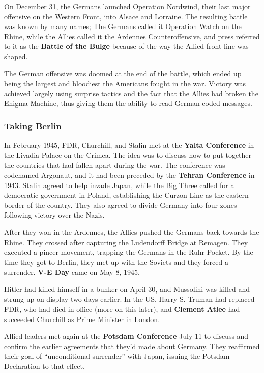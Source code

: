 On December 31, the Germans launched Operation Nordwind,
their last major offensive on the Western Front,
into Alsace and Lorraine.
The resulting battle was known by many names;
The Germans called it Operation Watch on the Rhine,
while the Allies called it the Ardennes Counteroffensive,
and press referred to it as the \textbf{Battle of the Bulge}
because of the way the Allied front line was shaped.

The German offensive was doomed at the end of the battle,
which ended up being the largest and bloodiest the Americans fought in the war.
Victory was achieved largely using surprise tactics
and the fact that the Allies had broken the Enigma Machine,
thus giving them the ability to read German coded messages.

\subsubsection*{Taking Berlin}

In February 1945, FDR, Churchill, and Stalin
met at the \textbf{Yalta Conference} in the Livadia Palace on the Crimea.
The idea was to discuss how to put together the countries that had fallen apart during the war.
The conference was codenamed Argonaut,
and it had been preceded by the \textbf{Tehran Conference} in 1943.
Stalin agreed to help invade Japan,
while the Big Three called for a democratic government in Poland,
establishing the Curzon Line as the eastern border of the country.
They also agreed to divide Germany into four zones following victory over the Nazis.

After they won in the Ardennes, the Allies pushed the Germans back towards the Rhine.
They crossed after capturing the Ludendorff Bridge at Remagen.
They executed a pincer movement, trapping the Germans in the Ruhr Pocket.
By the time they got to Berlin, they met up with the Soviets and they forced a surrender.
\textbf{V-E Day} came on May 8, 1945.

Hitler had killed himself in a bunker on April 30,
and Mussolini was killed and strung up on display two days earlier.
In the US, Harry S. Truman had replaced FDR, who had died in office (more on this later),
and \textbf{Clement Atlee} had succeeded Churchill as Prime Minister in London.

Allied leaders met again at the \textbf{Potsdam Conference} July 11
to discuss and confirm the earlier agreements that they'd made about Germany.
They reaffirmed their goal of ``unconditional surrender'' with Japan,
issuing the Potsdam Declaration to that effect.

